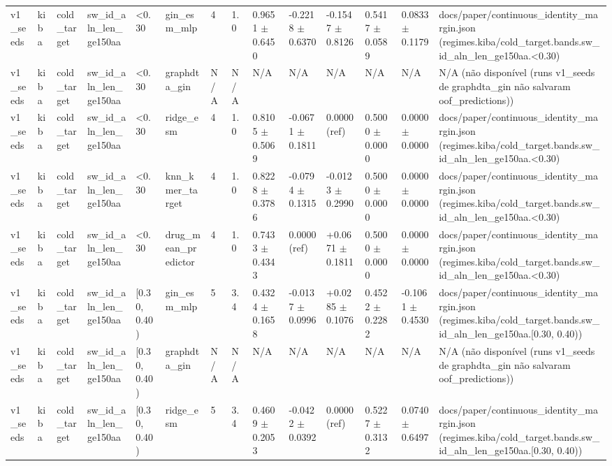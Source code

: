 \begin{table}[htbp]
\begin{tabular}{llllllllllllll}
v1\_seeds & kiba & cold\_target & sw\_id\_aln\_len\_ge150aa & <0.30 & gin\_esm\_mlp & 4 & 1.0 & 0.9651 $\pm$ 0.6450 & -0.2218 $\pm$ 0.6370 & -0.1547 $\pm$ 0.8126 & 0.5417 $\pm$ 0.0589 & 0.0833 $\pm$ 0.1179 & docs/paper/continuous\_identity\_margin.json (regimes.kiba/cold\_target.bands.sw\_id\_aln\_len\_ge150aa.<0.30) \\
v1\_seeds & kiba & cold\_target & sw\_id\_aln\_len\_ge150aa & <0.30 & graphdta\_gin & N/A & N/A & N/A & N/A & N/A & N/A & N/A & N/A (não disponível (runs v1\_seeds de graphdta\_gin não salvaram oof\_predictions)) \\
v1\_seeds & kiba & cold\_target & sw\_id\_aln\_len\_ge150aa & <0.30 & ridge\_esm & 4 & 1.0 & 0.8105 $\pm$ 0.5069 & -0.0671 $\pm$ 0.1811 & 0.0000 (ref) & 0.5000 $\pm$ 0.0000 & 0.0000 $\pm$ 0.0000 & docs/paper/continuous\_identity\_margin.json (regimes.kiba/cold\_target.bands.sw\_id\_aln\_len\_ge150aa.<0.30) \\
v1\_seeds & kiba & cold\_target & sw\_id\_aln\_len\_ge150aa & <0.30 & knn\_kmer\_target & 4 & 1.0 & 0.8228 $\pm$ 0.3786 & -0.0794 $\pm$ 0.1315 & -0.0123 $\pm$ 0.2990 & 0.5000 $\pm$ 0.0000 & 0.0000 $\pm$ 0.0000 & docs/paper/continuous\_identity\_margin.json (regimes.kiba/cold\_target.bands.sw\_id\_aln\_len\_ge150aa.<0.30) \\
v1\_seeds & kiba & cold\_target & sw\_id\_aln\_len\_ge150aa & <0.30 & drug\_mean\_predictor & 4 & 1.0 & 0.7433 $\pm$ 0.4343 & 0.0000 (ref) & +0.0671 $\pm$ 0.1811 & 0.5000 $\pm$ 0.0000 & 0.0000 $\pm$ 0.0000 & docs/paper/continuous\_identity\_margin.json (regimes.kiba/cold\_target.bands.sw\_id\_aln\_len\_ge150aa.<0.30) \\
v1\_seeds & kiba & cold\_target & sw\_id\_aln\_len\_ge150aa & [0.30, 0.40) & gin\_esm\_mlp & 5 & 3.4 & 0.4324 $\pm$ 0.1658 & -0.0137 $\pm$ 0.0996 & +0.0285 $\pm$ 0.1076 & 0.4522 $\pm$ 0.2282 & -0.1061 $\pm$ 0.4530 & docs/paper/continuous\_identity\_margin.json (regimes.kiba/cold\_target.bands.sw\_id\_aln\_len\_ge150aa.[0.30, 0.40)) \\
v1\_seeds & kiba & cold\_target & sw\_id\_aln\_len\_ge150aa & [0.30, 0.40) & graphdta\_gin & N/A & N/A & N/A & N/A & N/A & N/A & N/A & N/A (não disponível (runs v1\_seeds de graphdta\_gin não salvaram oof\_predictions)) \\
v1\_seeds & kiba & cold\_target & sw\_id\_aln\_len\_ge150aa & [0.30, 0.40) & ridge\_esm & 5 & 3.4 & 0.4609 $\pm$ 0.2053 & -0.0422 $\pm$ 0.0392 & 0.0000 (ref) & 0.5227 $\pm$ 0.3132 & 0.0740 $\pm$ 0.6497 & docs/paper/continuous\_identity\_margin.json (regimes.kiba/cold\_target.bands.sw\_id\_aln\_len\_ge150aa.[0.30, 0.40)) \\

\end{tabular}
\end{table}
